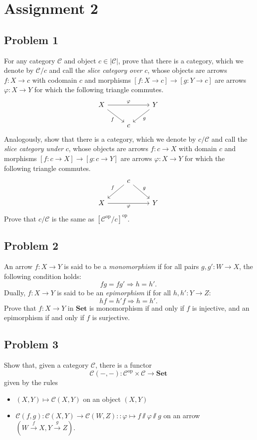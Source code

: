 \documentclass{amsart}
\theoremstyle{remark}
\theoremstyle{definition}
\theoremstyle{definition}
\newcommand{\To}[1]{\xrightarrow{#1}}
\def\then{\sslash}
\def\op{^{\text{op}}}
\def\Set{\mathbf{Set}}
\begin{document}
\section{Assignment 2}

\subsection{Problem 1}

For any category $\mathcal{C}$ and object $c\in|\mathcal{C}|$, prove that there is a category, which we denote by $\mathcal{C}/c$ and call the \emph{slice category over} $c$, whose objects are arrows $f:X\to c$ with codomain $c$ and morphisms $[f:X\to c]\to[g:Y\to c]$ are  arrows $\varphi : X\to Y$ for which the following triangle commutes.
\[
\begin{tikzcd}
X \arrow[dr,"f"'] \arrow[rr,"\varphi"] & & Y \arrow[dl,"g"] \\
& c & 
\end{tikzcd}
\]
Analogously, show that there is a category, which we denote by $c/\mathcal{C}$ and call the \emph{slice category under} $c$, whose objects are arrows $f:c\to X$ with domain $c$
and morphisms $[f:c\to X]\to[g:c\to Y]$ are arrows $\varphi : X\to Y$ for which the following triangle commutes.
\[
\begin{tikzcd}
& c \arrow[dl,"f"'] \arrow[dr,"g"] & \\
X  \arrow[rr,"\varphi"'] & & Y 
\end{tikzcd}
\]
Prove that $c/\mathcal{C}$ is the same as $[\mathcal{C}\op/c]\op$.

\subsection{Problem 2}

An arrow $f:X\to Y$ is said to be a \emph{monomorphism} if for all pairs $g,g':W\to X$, the following condition holds:
\[fg=fg' \Rightarrow h=h'.\]
Dually, $f:X\to Y$ is said to be an \emph{epimorphism} if for all $h,h':Y\to Z$:
\[hf=h'f \Rightarrow h=h'.\]
Prove that $f:X\to Y$ in $\Set$ is monomorphism if and only if $f$ is injective, and an epimorphism if and only if $f$ is surjective.

\subsection{Problem 3}

Show that, given a category $\mathcal{C}$, there is a functor \[\mathcal{C}(-,-):\mathcal{C}\op\times\mathcal{C}\to\Set\] given by the rules
\begin{itemize}
    \item $(X,Y)\mapsto\mathcal{C}(X,Y)$ on an object $(X,Y)$
    \item $\mathcal{C}(f,g):\mathcal{C}(X,Y)\to\mathcal{C}(W,Z)::\varphi\mapsto f\then\varphi\then g$ on an arrow $(W\To{f} X,Y\To{g} Z)$.
\end{itemize}
\end{document}
